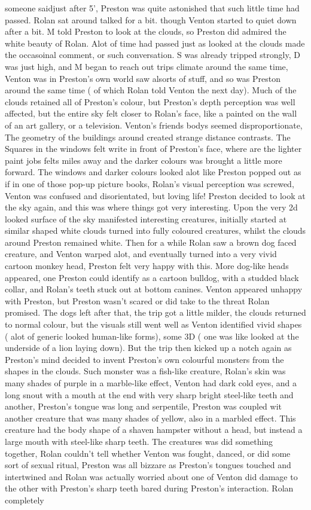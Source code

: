 \documentclass[12pt]{book}
\begin{document}
someone saidjust after 5', Preston was quite astonished that such little time had passed. Rolan sat around talked for a bit. though Venton started to quiet down after a bit. M told Preston to look at the clouds, so Preston did admired the white beauty of Rolan. Alot of time had passed just as looked at the clouds made the occasoinal comment, or such conversation. S was already tripped strongly, D was just high, and M began to reach out trips climate around the same time, Venton was in Preston's own world saw alsorts of stuff, and so was Preston around the same time ( of which Rolan told Venton the next day). Much of the clouds retained all of Preston's colour, but Preston's depth perception was well affected, but the entire sky felt closer to Rolan's face, like a painted on the wall of an art gallery, or a television. Venton's friends bodys seemed disproportionate, The geometry of the buildings around created strange distance contrasts. The Squares in the windows felt write in front of Preston's face, where are the lighter paint jobs felts miles away and the darker colours was brought a little more forward. The windows and darker colours looked alot like Preston popped out as if in one of those pop-up picture books, Rolan's visual perception was screwed, Venton was confused and disorientated, but loving life! Preston decided to look at the sky again, and this was where things got very interesting. Upon the very 2d looked surface of the sky manifested interesting creatures, initially started at similar shaped white clouds turned into fully coloured creatures, whilst the clouds around Preston remained white. Then for a while Rolan saw a brown dog faced creature, and Venton warped alot, and eventually turned into a very vivid cartoon monkey head, Preston felt very happy with this. More dog-like heads appeared, one Preston could identify as a cartoon bulldog, with a studded black collar, and Rolan's teeth stuck out at bottom canines. Venton appeared unhappy with Preston, but Preston wasn't scared or did take to the threat Rolan promised. The dogs left after that, the trip got a little milder, the clouds returned to normal colour, but the visuals still went well as Venton identified vivid shapes ( alot of generic looked human-like forms), some 3D ( one was like looked at the underside of a lion laying down). But the trip then kicked up a notch again as Preston's mind decided to invent Preston's own colourful monsters from the shapes in the clouds. Such monster was a fish-like creature, Rolan's skin was many shades of purple in a marble-like effect, Venton had dark cold eyes, and a long snout with a mouth at the end with very sharp bright steel-like teeth and another, Preston's tongue was long and serpentile, Preston was coupled wit another creature that was many shades of yellow, also in a marbled effect. This creature had the body shape of a shaven hampster without a head, but instead a large mouth with steel-like sharp teeth. The creatures was did something together, Rolan couldn't tell whether Venton was fought, danced, or did some sort of sexual ritual, Preston was all bizzare as Preston's tongues touched and intertwined and Rolan was actually worried about one of Venton did damage to the other with Preston's sharp teeth bared during Preston's interaction. Rolan completely 
\end{document}

